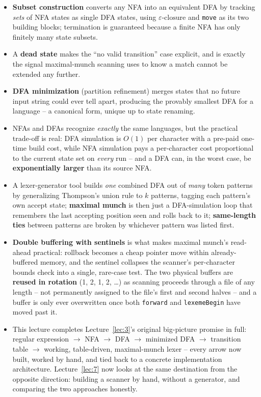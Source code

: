 \documentclass[full-course-notes.tex]{subfiles}
\begin{document}
\begin{takeaways}
\begin{itemize}
  \item \textbf{Subset construction} converts any NFA into an equivalent DFA by tracking
  \emph{sets} of NFA states as single DFA states, using $\varepsilon\text{-closure}$ and
  \texttt{move} as its two building blocks; termination is guaranteed because a finite NFA has
  only finitely many state subsets.
  \item A \textbf{dead state} makes the ``no valid transition'' case explicit, and is exactly
  the signal maximal-munch scanning uses to know a match cannot be extended any further.
  \item \textbf{DFA minimization} (partition refinement) merges states that no future input
  string could ever tell apart, producing the provably smallest DFA for a language -- a
  canonical form, unique up to state renaming.
  \item NFAs and DFAs recognize \emph{exactly} the same languages, but the practical trade-off
  is real: DFA simulation is $O(1)$ per character with a pre-paid one-time build cost, while NFA
  simulation pays a per-character cost proportional to the current state set on \emph{every}
  run -- and a DFA can, in the worst case, be \textbf{exponentially larger} than its source NFA.
  \item A lexer-generator tool builds \emph{one} combined DFA out of \emph{many} token patterns
  by generalizing Thompson's union rule to $k$ patterns, tagging each pattern's own accept
  state; \textbf{maximal munch} is then just a DFA-simulation loop that remembers the last
  accepting position seen and rolls back to it; \textbf{same-length ties} between patterns are
  broken by whichever pattern was listed first.
  \item \textbf{Double buffering with sentinels} is what makes maximal munch's read-ahead
  practical: rollback becomes a cheap pointer move within already-buffered memory, and the
  sentinel collapses the scanner's per-character bounds check into a single, rare-case test. The
  two physical buffers are \textbf{reused in rotation} (1, 2, 1, 2, \dots) as scanning proceeds
  through a file of any length -- not permanently assigned to the file's first and second
  halves -- and a buffer is only ever overwritten once both \texttt{forward} and
  \texttt{lexemeBegin} have moved past it.
  \item This lecture completes Lecture~\ref{lec:3}'s original big-picture promise in full:
  regular expression $\to$ NFA $\to$ DFA $\to$ minimized DFA $\to$ transition table $\to$
  working, table-driven, maximal-munch lexer -- every arrow now built, worked by hand, and tied
  back to a concrete implementation architecture. Lecture~\ref{lec:7} now looks at the same
  destination from the opposite direction: building a scanner by hand, without a generator, and
  comparing the two approaches honestly.
\end{itemize}
\end{takeaways}
\end{document}
